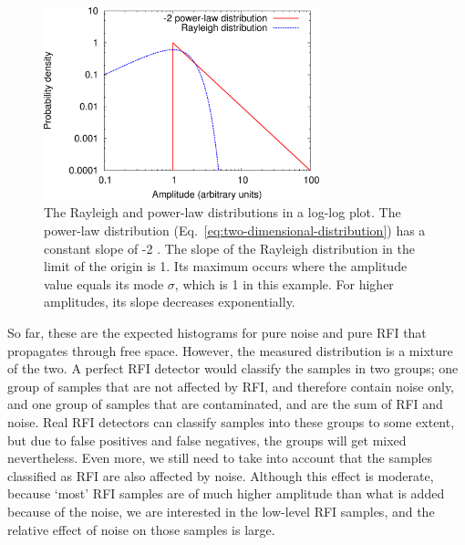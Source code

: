 \documentclass[useAMS,usenatbib]{mn2e}
\newcommand{\editmark}[1]{{\color{red}{\textbf{#1}}}}
\begin{document}
\begin{figure}
\begin{center}\hspace{-5mm}\includegraphics[width=8cm]{img/plot-rayleigh-and-rfi-trimmed}
\caption{The Rayleigh and power-law distributions in a log-log plot. The power-law distribution (Eq.~\eqref{eq:two-dimensional-distribution}) has a constant slope of -2 \editmark{over the range it is defined}. The slope of the Rayleigh distribution in the limit of the origin is 1. Its maximum occurs where the amplitude value equals its mode $\sigma$, which is 1 in this example. For higher amplitudes, its slope decreases exponentially.}
\label{fig:rayleigh-and-rfi-distributions}
\end{center}
\end{figure}

So far, these are the expected histograms for pure noise and pure RFI that propagates through free space. However, the measured distribution is a mixture of the two. A perfect RFI detector would classify the samples in two groups; one group of samples that are not affected by RFI, and therefore contain noise only, and one group of samples that are contaminated, and are the sum of RFI and noise. Real RFI detectors can classify samples into these groups to some extent, but due to false positives and false negatives, the groups will get mixed nevertheless. Even more, we still need to take into account that the samples classified as RFI are also affected by noise. Although this effect is moderate, because `most' RFI samples are of much higher amplitude than what is added because of the noise, we are interested in the low-level RFI samples, and the relative effect of noise on those samples is large.
\end{document}
